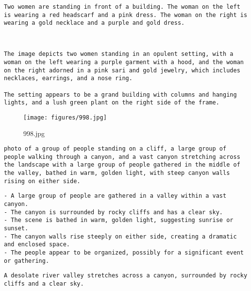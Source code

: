 \begin{lstlisting}[caption={Captions using Phi 4 with SAM 2 for 761.jpg}]
Two women are standing in front of a building. The woman on the left is wearing a red headscarf and a pink dress. The woman on the right is wearing a gold necklace and a purple and gold dress.
\end{lstlisting}


\begin{lstlisting}[caption={Captions using Llama 3.2 with SAM 2 for 761.jpg}]


The image depicts two women standing in an opulent setting, with a woman on the left wearing a purple garment with a hood, and the woman on the right adorned in a pink sari and gold jewelry, which includes necklaces, earrings, and a nose ring.

The setting appears to be a grand building with columns and hanging lights, and a lush green plant on the right side of the frame.
\end{lstlisting}

\clearpage
\begin{figure}[H]
    \centering
    \texttt{[image: figures/998.jpg]}
    \caption{998.jpg}
    \label{fig:998.jpg}
\end{figure}



\begin{lstlisting}[caption={Captions using Ensemble without Llama for 998.jpg}]
photo of a group of people standing on a cliff, a large group of people walking through a canyon, and a vast canyon stretching across the landscape with a large group of people gathered in the middle of the valley, bathed in warm, golden light, with steep canyon walls rising on either side.
\end{lstlisting}


\begin{lstlisting}[caption={Captions using Ensemble with Llama for 998.jpg}]
- A large group of people are gathered in a valley within a vast canyon.
- The canyon is surrounded by rocky cliffs and has a clear sky.
- The scene is bathed in warm, golden light, suggesting sunrise or sunset.
- The canyon walls rise steeply on either side, creating a dramatic and enclosed space.
- The people appear to be organized, possibly for a significant event or gathering.
\end{lstlisting}


\begin{lstlisting}[caption={Captions using Llama 3.2 for 998.jpg}]
A desolate river valley stretches across a canyon, surrounded by rocky cliffs and a clear sky.
\end{lstlisting}


